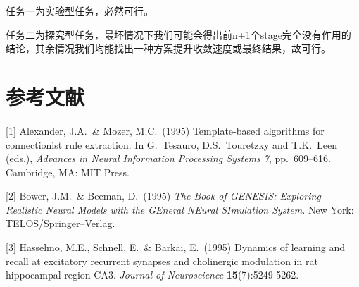 \documentclass{article}
\begin{document}
任务一为实验型任务，必然可行。

任务二为探究型任务，最坏情况下我们可能会得出前n+1个stage完全没有作用的结论，其余情况我们均能找出一种方案提升收敛速度或最终结果，故可行。

\section*{参考文献}


\medskip

\small

[1] Alexander, J.A.\ \& Mozer, M.C.\ (1995) Template-based algorithms
for connectionist rule extraction. In G.\ Tesauro, D.S.\ Touretzky and
T.K.\ Leen (eds.), {\it Advances in Neural Information Processing
  Systems 7}, pp.\ 609--616. Cambridge, MA: MIT Press.

[2] Bower, J.M.\ \& Beeman, D.\ (1995) {\it The Book of GENESIS:
  Exploring Realistic Neural Models with the GEneral NEural SImulation
  System.}  New York: TELOS/Springer--Verlag.

[3] Hasselmo, M.E., Schnell, E.\ \& Barkai, E.\ (1995) Dynamics of
learning and recall at excitatory recurrent synapses and cholinergic
modulation in rat hippocampal region CA3. {\it Journal of
  Neuroscience} {\bf 15}(7):5249-5262.
\end{document}
